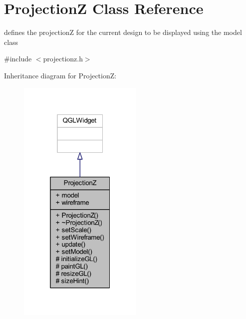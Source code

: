 \hypertarget{class_projection_z}{}\section{ProjectionZ Class Reference}
\label{class_projection_z}


defines the projectionZ for the current design to be displayed using the model class  




{\ttfamily \#include $<$projectionz.\+h$>$}



Inheritance diagram for ProjectionZ\+:\nopagebreak
\begin{figure}[H]
\begin{center}
\leavevmode
\includegraphics[width=169pt]{class_projection_z__inherit__graph}
\end{center}
\end{figure}


